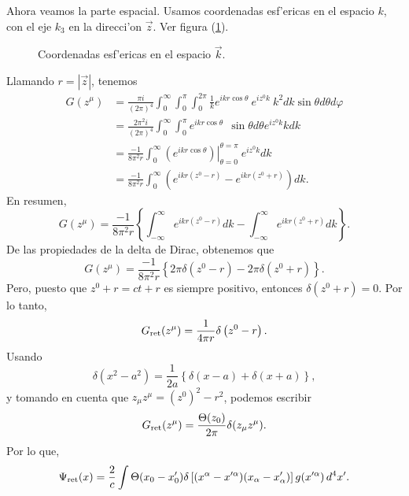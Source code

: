  Ahora veamos la parte espacial. Usamos coordenadas esf'ericas
 en el espacio $k$, con el eje $k_{3}$ en la direcci'on $\vec{z}$.
 Ver figura (\ref{R4}).
 \begin{figure}[h]
 \centerline{}
 \caption{Coordenadas esf'ericas en el espacio $\vec{k}$.}
 \label{R4}
 \end{figure}

 Llamando $r=\left\vert \vec{z}\right\vert $, tenemos%
 \begin{align*}
 G(z^\mu)    & =\frac{\pi i}{(2\pi)
 ^4}\int
 _{0}^{\infty}\int_{0}^{\pi}\int_{0}^{2\pi}\frac{1}{k}e^{ikr\cos\theta
 }~e^{iz^0k}~k^2dk\sin\theta d\theta d\varphi\\
 & =\frac{2\pi^2i}{(2\pi)
 ^4}\int_{0}^{\infty}\int_{0}^{\pi
 }e^{ikr\cos\theta}~~\sin\theta d\theta e^{iz^0k}kdk\\
 & =\frac{-1}{8\pi^2r}\int_{0}^{\infty}\left.  \left(
 e^{ikr\cos\theta
 }\right)  \right\vert _{\theta=0}^{\theta=\pi}~e^{iz^0k}dk\\
 & =\frac{-1}{8\pi^2r}\int_{0}^{\infty}\left(  e^{ikr\left(
 z^0-r\right) }-e^{ikr\left(  z^0+r\right)  }\right)  dk.
 \end{align*}
  En resumen,%
 \begin{equation}
 G(z^\mu)  =\frac{-1}{8\pi^2r}\left\{
 \int_{-\infty}^{\infty }e^{ikr\left(  z^0-r\right)
 }dk-\int_{-\infty}^{\infty}e^{ikr\left( z^0+r\right)
 }dk\right\}  .
 \end{equation}
 De las propiedades de la delta de Dirac, obtenemos que%
 \begin{equation}
 G(z^\mu)  =\frac{-1}{8\pi^2r}\left\{
 2\pi\delta\left( z^0-r\right)  -2\pi\delta\left(  z^0+r\right)
 \right\}  .
 \end{equation}
 Pero, puesto que $z^0+r=ct+r$ es siempre positivo, entonces
 $\delta\left(
 z^0+r\right)  =0$. Por lo tanto,%
 \begin{equation}
 G_{\rm ret}(z^\mu)  =\frac{1}{4\pi r}\delta\left(
 z^0-r\right)  .
 \end{equation}
 Usando
 \begin{equation}
 \delta\left(  x^2-a^2\right)  =\frac{1}{2a}\left\{
 \delta\left( x-a\right)  +\delta\left(  x+a\right)  \right\}  ,
 \end{equation}
 y  tomando en cuenta que $z_\mu z^\mu =(z^0)^2-r^2$, podemos escribir
 \begin{equation}
 G_{\rm ret}(z^\mu)  =\frac{\Theta(z_0)}{2\pi}\delta(z_\mu z^\mu) .
 \end{equation}
 Por lo que,%
 \begin{equation}
 \Psi_{\rm ret}(x)=\frac{2}{c}\int\Theta(x_0-x'_0)\delta\left[(x^{\alpha}-x^{\prime\alpha})  (x_{\alpha}-x_{\alpha }')\right] g(x^{\prime\alpha})\,d^4x'.\label{R-rela04}%
 \end{equation}
